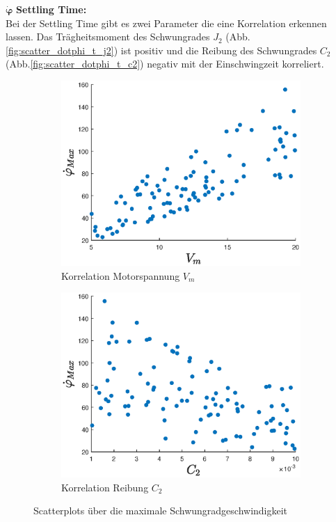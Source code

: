 $\bm{\dot\varphi}$ \textbf{Settling Time: }\\
Bei der Settling Time gibt es zwei Parameter die  eine Korrelation erkennen lassen.
Das Trägheitsmoment des Schwungrades $J_2$ (Abb.\ref{fig:scatter_dotphi_t_j2}) ist positiv und die Reibung des Schwungrades $C_2$ (Abb.\ref{fig:scatter_dotphi_t_c2}) negativ mit der Einschwingzeit korreliert.
\begin{figure}
    \centering
    \begin{subfigure}[]{0.45\textwidth}
        \centering
        \includegraphics[width=\textwidth]{Bilder/5_sensi/cm/dot_phi_max.eps}
        \caption{Korrelation Motorspannung $V_m$}
        \label{fig:scatter_dotphi_max}
    \end{subfigure}
   \begin{subfigure}[]{0.45\textwidth}
        \centering
        \includegraphics[width=\textwidth]{Bilder/5_sensi/cm/dot_phi_max_c2.eps}
        \caption{Korrelation Reibung $C_2$}
        \label{fig:scatter_dotphi_c2}
    \end{subfigure}
    \caption{Scatterplots über die maximale Schwungradgeschwindigkeit}
\end{figure}

